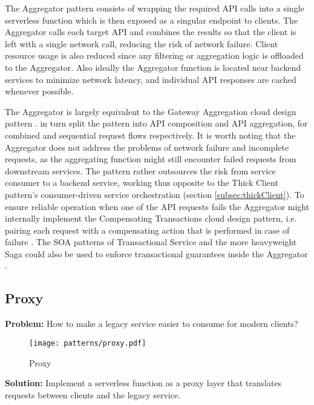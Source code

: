 The Aggregator pattern consists of wrapping the required API calls into a single serverless function which is then exposed as a singular endpoint to clients. The Aggregator calls each target API and combines the results so that the client is left with a single network call, reducing the risk of network failure. Client resource usage is also reduced since any filtering or aggregation logic is offloaded to the Aggregator. Also ideally the Aggregator function is located near backend services to minimize network latency, and individual API responses are cached whenever possible. \parencite{baldini17currentTrends}

The Aggregator is largely equivalent to the Gateway Aggregation cloud design pattern \parencite{microsoft18cloudPatterns}. \textcite{baldini17currentTrends} in turn split the pattern into API composition and API aggregation, for combined and sequential request flows respectively. It is worth noting that the Aggregator does not address the problems of network failure and incomplete requests, as the aggregating function might still encounter failed requests from downstream services. The pattern rather outsources the risk from service consumer to a backend service, working thus opposite to the Thick Client pattern's consumer-driven service orchestration (section \ref{subsec:thickClient}). To ensure reliable operation when one of the API requests fails the Aggregator might internally implement the Compensating Transactions cloud design pattern, i.e. pairing each request with a compensating action that is performed in case of failure \parencite{microsoft18cloudPatterns}. The SOA patterns of Transactional Service and the more heavyweight Saga could also be used to enforce transactional guarantees inside the Aggregator \parencite{rotem12soa}.

\subsection{Proxy} \label{subsec:proxy}

\textbf{Problem:} How to make a legacy service easier to consume for modern clients?

\begin{figure}[h]
  \centering
  \texttt{[image: patterns/proxy.pdf]}
  \caption{Proxy}
  \label{fig:proxy}
\end{figure}

\textbf{Solution:} Implement a serverless function as a proxy layer that translates requests between clients and the legacy service.

